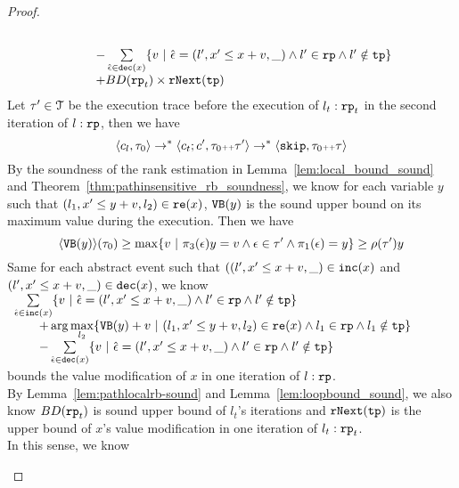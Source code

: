 \begin{proof}
\begin{itemize}
\[\begin{array}{l}
\begin{array}{l}
        \\ \qquad 
        - \sum\limits_{ \absevent \in \dec(x) }\left\{ 
        v 
        ~\middle\vert~ \absevent = (l', x' \leq x + v, \_) \land l' \in \rprog \land l' \notin \tpath \right\}
        \\ \qquad 
        + BD(\rprog_t) \times \rfnext(\tpath)
      \end{array}
    \end{array}
  \]
  Let $\mathtt{\tau}' \in \mathcal{T}$ be the execution trace before the execution of $l_t: \mathtt{rp}_t$ in the second iteration of $l:\mathtt{rp}$, then we have
  \[
    \langle c_l, \mathtt{\tau}_0 \rangle \to^* \langle c_t;c', \mathtt{\tau}_0 {\scriptscriptstyle ++} \mathtt{\tau}' \rangle \to^* \langle \mathtt{skip}, \mathtt{\tau}_0 {\scriptscriptstyle ++} \mathtt{\tau} \rangle
  \]
    By the soundness of the rank estimation in Lemma~\ref{lem:local_bound_sound} and Theorem~\ref{thm:pathinsensitive_rb_soundness}, we know 
    for each variable $y$ such that $(l_1, x' \leq y + v, l_2) \in \mathtt{re}(x) $,
    ${\mathtt{VB}}(y)$ is the sound upper bound on its maximum value during the execution. Then we have
    \[
      \config{\varinvar(y)}(\trace_0) \geq \max \left\{ v ~|~  \pi_3(\event) y = v \land \event \in \trace' \land \pi_1(\event) = y\right\}  \geq \env(\trace') y 
    \]
    Same for each abstract event such that $((l', x' \leq x + v, \_) \in \mathtt{inc}(x) $ and $(l', x' \leq x + v, \_) \in \mathtt{dec}(x)$,
    we know 
    $ \begin{array}{l}
      \sum\limits_{\absevent \in \inc(x) }
      \left\{ 
      v ~\middle\vert~ \absevent = (l', x' \leq x + v, \_) \land  l' \in \rprog 
      \land l' \notin \tpath \right\}
      \\ \qquad 
      + \arg\max\limits_{l_2 }
          \left\{ 
            \varinvar(y) + v ~\middle\vert~ 
          (l_1, x' \leq y + v, l_2) \in \reset(x) \land l_1 \in \rprog \land l_1 \notin \tpath
          \right\}
      \\ \qquad 
      - \sum\limits_{ \absevent \in \dec(x) }\left\{ 
      v 
      ~\middle\vert~ \absevent = (l', x' \leq x + v, \_) \land l' \in \rprog \land l' \notin \tpath \right\}
    \end{array}
    $ bounds the value modification of $x$ in one iteration of $l: \mathtt{rp}$.
  \\
  By Lemma~\ref{lem:pathlocalrb-sound} and Lemma~\ref{lem:loopbound_sound}, we also know $BD(\mathtt{rp}_t)$ is sound upper bound of $l_t$'s iterations and $\mathtt{rNext}(\mathtt{tp})$ is the upper bound of $x$'s value modification in one iteration of $l_t: \mathtt{rp}_t$.
  \\
  In this sense, we know

\end{itemize}
\end{proof}
